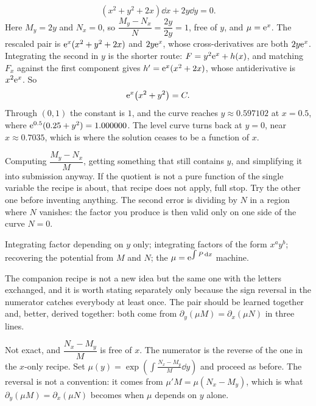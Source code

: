 \begin{worked}
\[(x^{2}+y^{2}+2x)\dd x+2y\dd y=0.\]
Here $M_y=2y$ and $N_x=0$, so $\dfrac{M_y-N_x}{N}=\dfrac{2y}{2y}=1$, free of $y$, and $\mu=\mathrm{e}^{x}$. The rescaled pair is $\mathrm{e}^{x}(x^{2}+y^{2}+2x)$ and $2y\mathrm{e}^{x}$, whose cross-derivatives are both $2y\mathrm{e}^{x}$. Integrating the second in $y$ is the shorter route: $F=y^{2}\mathrm{e}^{x}+h(x)$, and matching $F_x$ against the first component gives $h'=\mathrm{e}^{x}(x^{2}+2x)$, whose antiderivative is $x^{2}\mathrm{e}^{x}$. So
\[\mathrm{e}^{x}\bigl(x^{2}+y^{2}\bigr)=C.\]
Through $(0,1)$ the constant is $1$, and the curve reaches $y\approx0.597102$ at $x=0.5$, where $\mathrm{e}^{0.5}(0.25+y^{2})=1.000000$. The level curve turns back at $y=0$, near $x\approx0.7035$, which is where the solution ceases to be a function of $x$.
\end{worked}

\begin{trap}
Computing $\dfrac{M_y-N_x}{M}$, getting something that still contains $y$, and simplifying it into submission anyway. If the quotient is not a pure function of the single variable the recipe is about, that recipe does not apply, full stop. Try the other one before inventing anything. The second error is dividing by $N$ in a region where $N$ vanishes: the factor you produce is then valid only on one side of the curve $N=0$.
\end{trap}

\begin{seealsob}Integrating factor depending on $y$ only; integrating factors of the form $x^{a}y^{b}$; recovering the potential from $M$ and $N$; the $\mu=\mathrm{e}^{\int P\,\mathrm{d} x}$ machine.\end{seealsob}

The companion recipe is not a new idea but the same one with the letters exchanged, and it is worth stating separately only because the sign reversal in the numerator catches everybody at least once. The pair should be learned together and, better, derived together: both come from $\partial_y(\mu M)=\partial_x(\mu N)$ in three lines.

\cue Not exact, and $\dfrac{N_x-M_y}{M}$ is free of $x$. The numerator is the reverse of the one in the $x$-only recipe.
\method Set $\displaystyle\mu(y)=\exp\left(\int\frac{N_x-M_y}{M}\dd y\right)$ and proceed as before. The reversal is not a convention: it comes from $\mu'M=\mu(N_x-M_y)$, which is what $\partial_y(\mu M)=\partial_x(\mu N)$ becomes when $\mu$ depends on $y$ alone.

